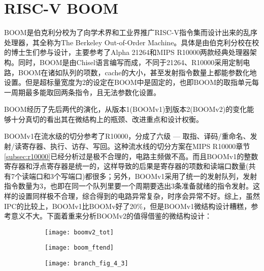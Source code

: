 \section{RISC-V BOOM}\label{subsec:BOOM}

BOOM是伯克利分校为了向学术界和工业界推广RISC-V指令集而设计出来的乱序处理器，其全称为The Berkeley Out-of-Order Machine。具体是由伯克利分校在校的博士生们参与设计，主要参考了Alpha 21264和MIPS R10000两款经典处理器架构。同时，BOOM是由Chisel语言编写而成，不同于21264、R10000采用定制电路，BOOM在诸如队列的项数，cache的大小，甚至发射指令数量上都能参数化地设置。但是超标量宽度为2的设定在BOOM中是固定的，也即BOOM的取指单元每一周期最多能取回两条指令，且无法参数化设置。

BOOM经历了先后两代的演化，从版本1(BOOMv1)到版本2(BOOMv2)的变化能够十分真切的看出其在微结构上的瓶颈、改进重点和设计权衡。

BOOMv1在流水级的切分参考了R10000，分成了六级 --- 取指、译码/重命名、发射/读寄存器、执行、访存、写回\citep{Celio:EECS-2017-157}。这种流水线的切分方案在MIPS R10000章节\ref{subsec:r10000}已经分析过是极不合理的，电路主频做不高。而且BOOMv1的整数寄存器和浮点寄存器是统一的，这样导致的后果是寄存器的项数和读端口数量(共有7个读端口和3个写端口)都很多；另外，BOOMv1采用了统一的发射队列，发射指令数量为3，也即在同一个队列里要一个周期要选出3条准备就绪的指令发射\citep{Celio:EECS-2017-157}。这样的设置同样极不合理，综合得到的电路异常复杂，时序会异常不好。综上，虽然IPC的比较上，BOOMv1比BOOMv好了20\%\citep{Celio:EECS-2017-157}，但是BOOMv1微结构设计糟糕，参考意义不大。下面着重来分析BOOMv2的值得借鉴的微结构设计：
\begin{figure}[!htbp]
\centering
	\begin{subfigure}[b]{.45\textwidth}
		\texttt{[image: boomv2\_tot]}
		\caption{}
		\label{fig:boom_total}
	\end{subfigure}\qquad
	\begin{subfigure}[b]{.45\textwidth}
		\texttt{[image: boom\_ftend]}
		\caption{}
		\label{fig:boom_ftend}
		
		\vspace{2ex}
		
		\texttt{[image: branch\_fig\_4\_3]}
		\caption{}
		\label{fig:boom_predictor}
	\end{subfigure}
	\label{fig:boomv2}
\end{figure}

